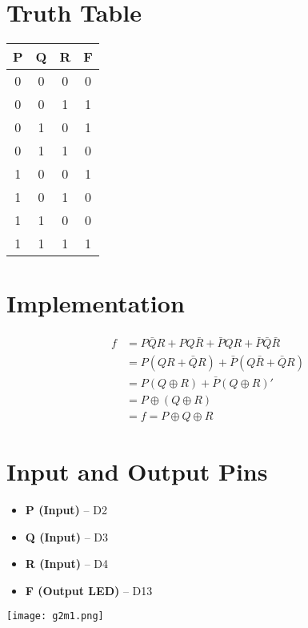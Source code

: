 \documentclass[12pt]{article}
\begin{document}
\section{Truth Table}

\begin{center}
\begin{tabular}{|c|c|c|c|}
\hline
P & Q & R & F \\
\hline
0 & 0 & 0 & 0 \\
0 & 0 & 1 & 1 \\
0 & 1 & 0 & 1 \\
0 & 1 & 1 & 0 \\
1 & 0 & 0 & 1 \\
1 & 0 & 1 & 0 \\
1 & 1 & 0 & 0 \\
1 & 1 & 1 & 1 \\
\hline
\end{tabular}
\end{center}

\section{Implementation}
\begin{align*}
f &= P \bar{Q} R + P Q \bar{R} + \bar{P} Q R + \bar{P} \bar{Q} \bar{R} \\
  &= P (QR + \bar{Q} R) + \bar{P}(Q \bar{R} + \bar{Q} R) \\
  &= P(Q \oplus R) + \bar{P}(Q \oplus R)' \\
  &= P \oplus (Q \oplus R) \\
  &= f = P \oplus Q \oplus R
\end{align*}

\section{Input and Output Pins}
\begin{itemize}
    \item \textbf{P (Input)} – D2
    \item \textbf{Q (Input)} – D3
    \item \textbf{R (Input)} – D4
    \item \textbf{F (Output LED)} – D13
\end{itemize}

\texttt{[image: g2m1.png]} \\[0.5em]    
\end{document}
